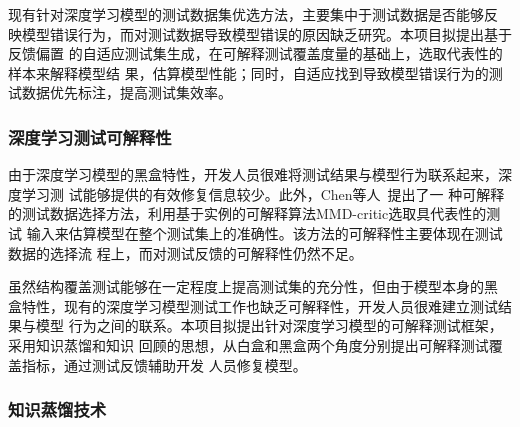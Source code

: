 {\kaishu 现有针对深度学习模型的测试数据集优选方法，主要集中于测试数据是否能够反
映模型错误行为，而对测试数据导致模型错误的原因缺乏研究。本项目拟提出基于反馈偏置
的自适应测试集生成，在可解释测试覆盖度量的基础上，选取代表性的样本来解释模型结
果，估算模型性能；同时，自适应找到导致模型错误行为的测试数据优先标注，提高测试集效率。}










\subsubsection{深度学习测试可解释性}




由于深度学习模型的黑盒特性，开发人员很难将测试结果与模型行为联系起来，深度学习测
试能够提供的有效修复信息较少。此外，Chen等人~提出了一
种可解释的测试数据选择方法，利用基于实例的可解释算法MMD-critic选取具代表性的测试
输入来估算模型在整个测试集上的准确性。该方法的可解释性主要体现在测试数据的选择流
程上，而对测试反馈的可解释性仍然不足。

{\kaishu 虽然结构覆盖测试能够在一定程度上提高测试集的充分性，但由于模型本身的黑
盒特性，现有的深度学习模型测试工作也缺乏可解释性，开发人员很难建立测试结果与模型
行为之间的联系。本项目拟提出针对深度学习模型的可解释测试框架，采用知识蒸馏和知识
回顾的思想，从白盒和黑盒两个角度分别提出可解释测试覆盖指标，通过测试反馈辅助开发
人员修复模型。}




\subsubsection{知识蒸馏技术}


